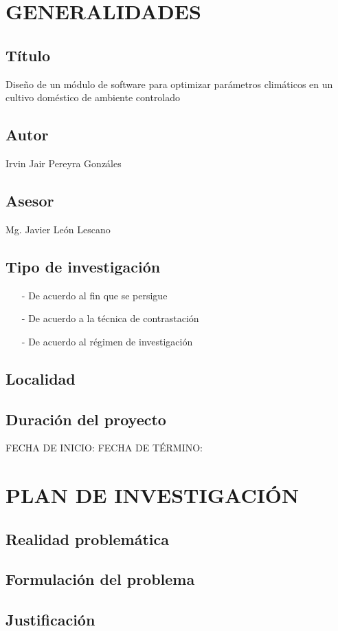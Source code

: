 \documentclass{report}
\date{\today}
\begin{document}
\tableofcontents
{}

\section{GENERALIDADES}
\subsection{Título}
Diseño de un módulo de software para optimizar parámetros climáticos en un
cultivo doméstico de ambiente controlado
\subsection{Autor}
Irvin Jair Pereyra Gonzáles
\subsection{Asesor}
Mg. Javier León Lescano
\subsection{Tipo de investigación}
\begin{enumerate}
\item[-] De acuerdo al fin que se persigue
\item[-] De acuerdo a la técnica de contrastación
\item[-] De acuerdo al régimen de investigación
\end{enumerate}
\subsection{Localidad}
\subsection{Duración del proyecto}
FECHA DE INICIO:
FECHA DE TÉRMINO:
\section{PLAN DE INVESTIGACIÓN}
\subsection{Realidad problemática}
\subsection{Formulación del problema}
\subsection{Justificación}
\end{document}
